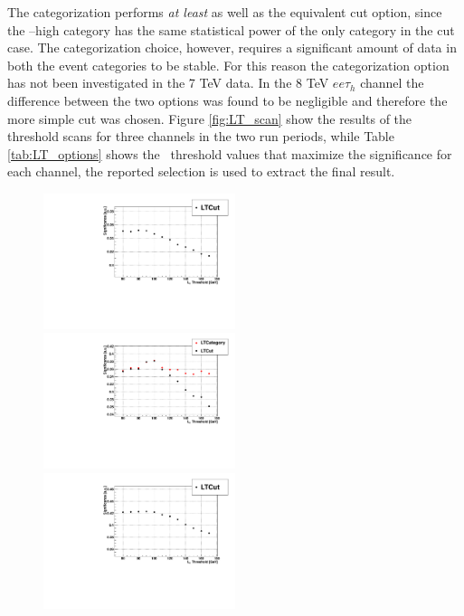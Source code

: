The categorization performs \emph{at least} as well as the equivalent cut option, since the \LT--high category has the same statistical power of the only category in the cut case. The categorization choice, however, requires a significant amount of data in both the event categories to be stable. For this reason the categorization option has not been investigated in the 7 TeV data. In the 8 TeV $ee\tau_h$ channel the difference between the two options was found to be negligible and therefore the more simple cut was chosen. Figure \ref{fig:LT_scan} show the results of the threshold scans for three channels in the two run periods, while Table \ref{tab:LT_options} shows the \LT\ threshold values that maximize the significance for each channel, the reported selection is used to extract the final result.

\begin{figure}
  \includegraphics[width=0.5\textwidth]{4_Analisys/pics/7TeV/limits/mmt.pdf}
  \includegraphics[width=0.5\textwidth]{4_Analisys/pics/8TeV/limits/mmt.pdf} \\
  \includegraphics[width=0.5\textwidth]{4_Analisys/pics/7TeV/limits/emt.pdf}

\end{figure}
